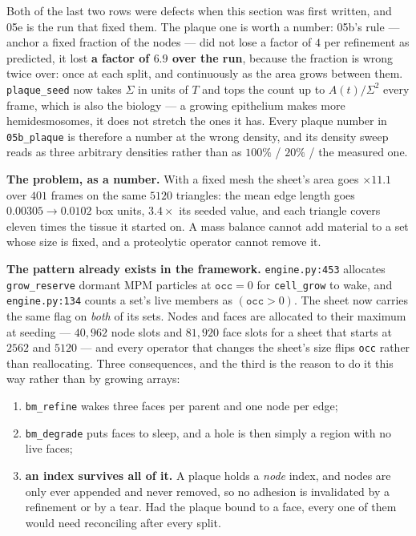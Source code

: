 \documentclass[10pt,a4paper]{article}
\newcommand{\code}[1]{\texttt{#1}}
\newcommand{\op}[1]{\texttt{#1}}
\begin{document}
Both of the last two rows were defects when this section was first written, and 05e is the run that
fixed them. The plaque one is worth a number: 05b's rule --- anchor a fixed fraction of the nodes ---
did not lose a factor of $4$ per refinement as predicted, it lost \textbf{a factor of $6.9$ over the
run}, because the fraction is wrong twice over: once at each split, and continuously as the area grows
between them. \op{plaque\_seed} now takes $\Sigma$ in units of $T$ and tops the count up to
$A(t)/\Sigma^2$ every frame, which is also the biology --- a growing epithelium makes more
hemidesmosomes, it does not stretch the ones it has. Every plaque number in \op{05b\_plaque} is
therefore a number at the wrong density, and its density sweep reads as three arbitrary densities rather
than as $100\%$ / $20\%$ / the measured one.

\textbf{The problem, as a number.} With a fixed mesh the sheet's area goes $\times11.1$ over $401$
frames on the same $5120$ triangles: the mean edge length goes $0.00305\to0.0102$ box units, $3.4\times$
its seeded value, and each triangle covers eleven times the tissue it started on. A mass balance cannot
add material to a set whose size is fixed, and a proteolytic operator cannot remove it.

\textbf{The pattern already exists in the framework.} \code{engine.py:453} allocates \code{grow\_reserve}
dormant MPM particles at $\code{occ}=0$ for \op{cell\_grow} to wake, and \code{engine.py:134} counts a
set's live members as $(\code{occ}>0)$. The sheet now carries the same flag on \emph{both} of its sets.
Nodes and faces are allocated to their maximum at seeding --- $40{,}962$ node slots and $81{,}920$ face
slots for a sheet that starts at $2562$ and $5120$ --- and every operator that changes the sheet's size
flips \code{occ} rather than reallocating. Three consequences, and the third is the reason to do it this
way rather than by growing arrays:

\begin{enumerate}\itemsep0pt
\item \op{bm\_refine} wakes three faces per parent and one node per edge;
\item \op{bm\_degrade} puts faces to sleep, and a hole is then simply a region with no live faces;
\item \textbf{an index survives all of it.} A plaque holds a \emph{node} index, and nodes are only ever
appended and never removed, so no adhesion is invalidated by a refinement or by a tear. Had the plaque
bound to a face, every one of them would need reconciling after every split.
\end{enumerate}
\end{document}
